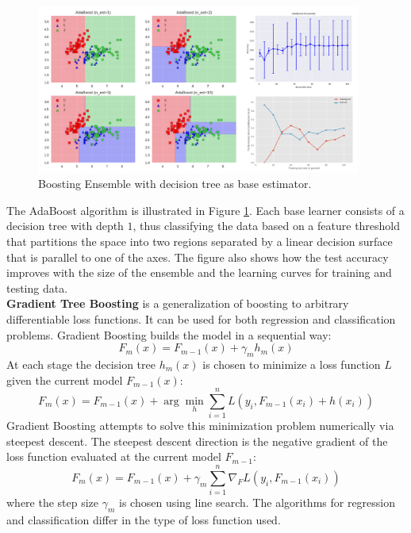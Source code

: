 \begin{figure}[tbhp]
    \centering
    \includegraphics[width=0.95\textwidth, trim={10 10 10 10}]{figures/ensemble_boosting_merged.png}
    \caption{Boosting Ensemble with decision tree as base estimator.}
    \label{fig:ensemble_boosting}
\end{figure}

The AdaBoost algorithm is illustrated in Figure \ref{fig:ensemble_boosting}. Each base learner consists of a decision tree with depth $1$, thus classifying the data based on a feature threshold that partitions the space into two regions separated by a linear decision surface that is parallel to one of the axes. The figure also shows how the test accuracy improves with the size of the ensemble and the learning curves for training and testing data.\\

\textbf{Gradient Tree Boosting} is a generalization of boosting to arbitrary differentiable loss functions. It can be used for both regression and classification problems. Gradient Boosting builds the model in a sequential way:
\begin{equation}
    F_m(x) = F_{m-1}(x) + \gamma_m h_m(x)
\end{equation}
At each stage the decision tree $h_m(x)$ is chosen to minimize a loss function $L$ given the current model $F_{m-1}(x)$:
\begin{equation}
    F_m(x) = F_{m-1}(x) + \arg \min_h \sum_{i=1}^{n} L(y_i, F_{m-1}(x_i) + h(x_i))
\end{equation}
Gradient Boosting attempts to solve this minimization problem numerically via steepest descent. The steepest descent direction is the negative gradient of the loss function evaluated at the current model $F_{m-1}$:
\begin{equation}
    F_m(x) = F_{m-1}(x) + \gamma_m \sum_{i=1}^{n} \nabla_F L(y_i, F_{m-1}(x_i))
\end{equation}
where the step size $\gamma_m$ is chosen using line search. The algorithms for regression and classification differ in the type of loss function used.


